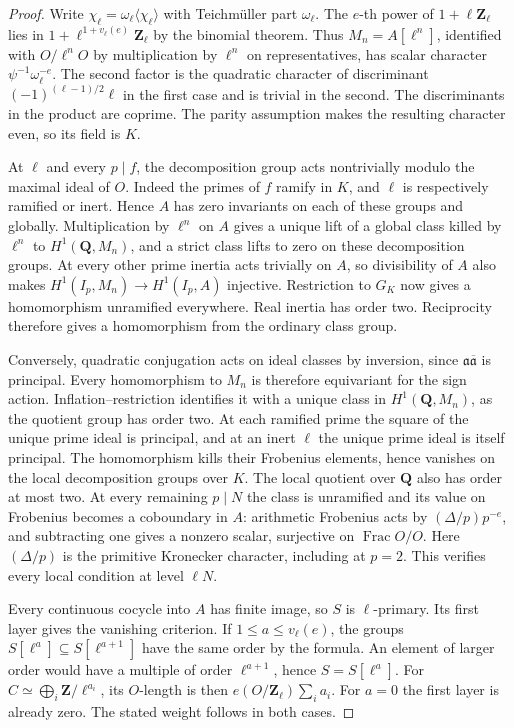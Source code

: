 \begin{proof}
Write \(\chi_\ell=\omega_\ell\langle\chi_\ell\rangle\) with Teichm\"uller
part \(\omega_\ell\). The \(e\)-th power of \(1+\ell\mathbf Z_\ell\)
lies in \(1+\ell^{1+v_\ell(e)}\mathbf Z_\ell\) by the binomial theorem.
Thus \(M_n=A[\ell^n]\), identified with \(O/\ell^nO\) by multiplication
by \(\ell^n\) on representatives, has scalar character
\(\psi^{-1}\omega_\ell^{-e}\). The second factor is the quadratic character
of discriminant \((-1)^{(\ell-1)/2}\ell\) in the first case and is trivial
in the second. The discriminants in the product are coprime. The parity
assumption makes the resulting character even, so its field is \(K\).

At \(\ell\) and every \(p\mid f\), the decomposition group acts nontrivially
modulo the maximal ideal of \(O\). Indeed the primes of \(f\) ramify in
\(K\), and \(\ell\) is respectively ramified or inert. Hence \(A\) has
zero invariants on each of these groups and globally. Multiplication by
\(\ell^n\) on \(A\) gives a unique lift of a global class killed by
\(\ell^n\) to \(H^1(\mathbf Q,M_n)\), and a strict class lifts to zero on
these decomposition groups. At every other prime inertia acts trivially
on \(A\), so divisibility of \(A\) also makes \(H^1(I_p,M_n)\to H^1(I_p,A)\)
injective. Restriction to \(G_K\) now gives a homomorphism unramified
everywhere. Real inertia has order two. Reciprocity therefore gives a
homomorphism from the ordinary class group.

Conversely, quadratic conjugation acts on ideal classes by inversion,
since \(\mathfrak a\overline{\mathfrak a}\) is principal. Every
homomorphism to \(M_n\) is therefore equivariant for the sign action.
Inflation--restriction identifies it with a unique class in
\(H^1(\mathbf Q,M_n)\), as the quotient group has order two.
At each ramified prime the square of the unique prime ideal is principal,
and at an inert \(\ell\) the unique prime ideal is itself principal.
The homomorphism kills their Frobenius elements, hence vanishes on the
local decomposition groups over \(K\). The local quotient over \(\mathbf Q\)
also has order at most two. At every remaining \(p\mid N\) the class is
unramified and its value on Frobenius becomes a coboundary in \(A\):
arithmetic Frobenius acts by \((\Delta/p)p^{-e}\), and subtracting one
gives a nonzero scalar, surjective on \(\operatorname{Frac}O/O\).
Here \((\Delta/p)\) is the primitive Kronecker character, including at
\(p=2\). This verifies every local condition at level \(\ell N\).

Every continuous cocycle into \(A\) has finite image, so \(S\) is
\(\ell\)-primary. Its first layer gives the vanishing criterion. If
\(1\le a\le v_\ell(e)\), the groups \(S[\ell^a]\subseteq S[\ell^{a+1}]\)
have the same order by the formula. An element of larger order would
have a multiple of order \(\ell^{a+1}\), hence \(S=S[\ell^a]\).
For \(C\simeq\bigoplus_i\mathbf Z/\ell^{a_i}\), its \(O\)-length is then
\(e(O/\mathbf Z_\ell)\sum_i a_i\). For \(a=0\) the first layer is already
zero. The stated weight follows in both cases.
\end{proof}


